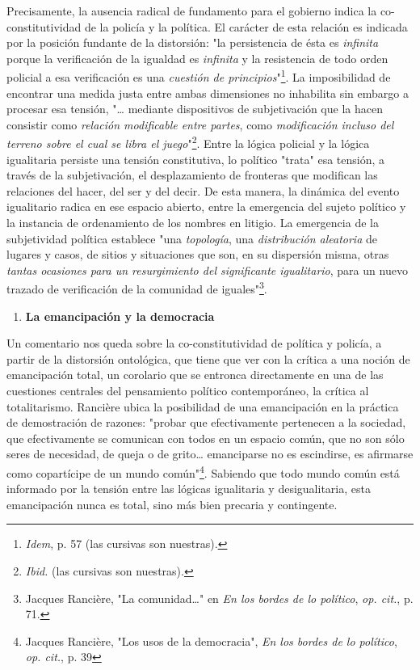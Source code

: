 \documentclass{book}
\begin{document}
Precisamente, la ausencia radical de fundamento para el gobierno indica
la co-constitutividad de la policía y la política. El carácter de esta
relación es indicada por la posición fundante de la distorsión: "la
persistencia de ésta es \emph{infinita} porque la verificación de la
igualdad es \emph{infinita} y la resistencia de todo orden policial a
esa verificación es una \emph{cuestión de principios}"\footnote{\emph{Idem},
  p. 57 (las cursivas son nuestras).}. La imposibilidad de encontrar una
medida justa entre ambas dimensiones no inhabilita sin embargo a
procesar esa tensión, "\ldots{} mediante dispositivos de subjetivación
que la hacen consistir como \emph{relación modificable entre partes},
como \emph{modificación incluso del terreno sobre el cual se libra el
juego}"\footnote{\emph{Ibid.} (las cursivas son nuestras).}. Entre la
lógica policial y la lógica igualitaria persiste una tensión
constitutiva, lo político "trata" esa tensión, a través de la
subjetivación, el desplazamiento de fronteras que modifican las
relaciones del hacer, del ser y del decir. De esta manera, la dinámica
del evento igualitario radica en ese espacio abierto, entre la
emergencia del sujeto político y la instancia de ordenamiento de los
nombres en litigio. La emergencia de la subjetividad política establece
"una \emph{topología}, una \emph{distribución aleatoria} de lugares y
casos, de sitios y situaciones que son, en su dispersión misma, otras
\emph{tantas ocasiones para un resurgimiento del significante
igualitario}, para un nuevo trazado de verificación de la comunidad de
iguales"\footnote{Jacques Rancière, "La comunidad\ldots" en \emph{En los
  bordes de lo político}, \emph{op. cit.}, p. 71.}.

\begin{enumerate}
\def\labelenumi{\arabic{enumi}.}
\setcounter{enumi}{5}
\item
  \textbf{La emancipación y la democracia}
\end{enumerate}

Un comentario nos queda sobre la co-constitutividad de política y
policía, a partir de la distorsión ontológica, que tiene que ver con la
crítica a una noción de emancipación total, un corolario que se entronca
directamente en una de las cuestiones centrales del pensamiento político
contemporáneo, la crítica al totalitarismo. Rancière ubica la
posibilidad de una emancipación en la práctica de demostración de
razones: "probar que efectivamente pertenecen a la sociedad, que
efectivamente se comunican con todos en un espacio común, que no son
sólo seres de necesidad, de queja o de grito\ldots{} emanciparse no es
escindirse, es afirmarse como copartícipe de un mundo común"\footnote{Jacques
  Rancière, "Los usos de la democracia", \emph{En los bordes de lo
  político}, \emph{op. cit.}, p. 39}. Sabiendo que todo mundo común está
informado por la tensión entre las lógicas igualitaria y desigualitaria,
esta emancipación nunca es total, sino más bien precaria y contingente.
\end{document}

